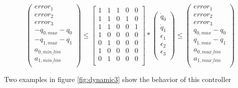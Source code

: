 $$
\left( \begin{array}{c}
error_{1} \\
error_{2} \\
error_{3} \\
-q_{0,max} - q_{0} \\
-q_{1,max} - q_{1} \\
a_{0,min\_lim} \\
a_{1,min\_lim} \\
\end{array}
\right)	\leq 
\left[ \begin{array}{ccccc}
1 & 1 & 1 & 0 & 0 \\
1 & 1 & 0 & 1 & 0 \\
1 & 1 & 0 & 0 & 1 \\
1 & 0 & 0 & 0 & 0 \\
0 & 1 & 0 & 0 & 0 \\
1 & 0 & 0 & 0 & 0 \\
0 & 1 & 0 & 0 & 0 \\
\end{array}
\right] *
\left( \begin{array}{c}
\dot{q}_{0} \\
\dot{q}_{1} \\
\epsilon_1 \\
\epsilon_2 \\
\epsilon_3 \\
\end{array}
\right) 
\leq \left( \begin{array}{c}
error_{1} \\
error_{2} \\
error_{3} \\
q_{0,max} - q_{0} \\
q_{1,max} - q_{1} \\
a_{0,max\_lim} \\
a_{1,max\_lim} \\
\end{array}
\right)
$$

Two examples in figure \ref{fig:dynamic3} show the behavior of this controller

